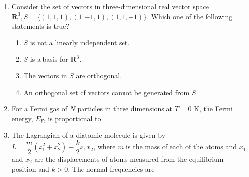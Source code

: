 \documentclass[14pt, a4paper]{extarticle}
\begin{document}
\begin{enumerate}[label=\textbf{Q. \arabic*}, start=21]
\item Consider the set of vectors in three-dimensional real vector space $\mathbf{R}^3, S = \{(1,1,1), (1,-1,1), (1,1,-1)\}$. Which one of the following statements is true?
\begin{enumerate}
\item $S$ is not a linearly independent set.
\item $S$ is a basis for $\mathbf{R}^3$.
\item The vectors in $S$ are orthogonal.
\item An orthogonal set of vectors cannot be generated from $S$.
\end{enumerate}

\item For a Fermi gas of $N$ particles in three dimensions at $T=0$ K, the Fermi energy, $E_F$, is proportional to
\begin{enumerate}
\end{enumerate}

\item The Lagrangian of a diatomic molecule is given by $L = \dfrac{m}{2}(\dot{x}_1^2 + \dot{x}_2^2) - \dfrac{k}{2}x_1 x_2$, where $m$ is the mass of each of the atoms and $x_1$ and $x_2$ are the displacements of atoms measured from the equilibrium position and $k > 0$. The normal frequencies are
\begin{enumerate}
\end{enumerate}


\end{enumerate}
\end{document}
